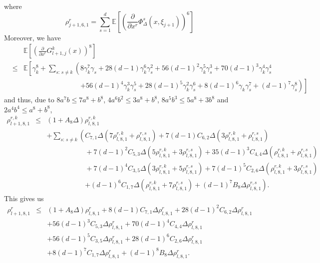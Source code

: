 \documentclass[11pt,a4paper]{amsart}
\theoremstyle{plain}
\theoremstyle{definition}
\theoremstyle{remark}
\numberwithin{equation}{section}
\newcommand*{\EE}{\mathbb E}
\renewcommand*{\doteq}{:=}
\begin{document}
where 
\[
\rho_{j+1,6,1}^{r}=\sum_{s=1}^d\EE\left[\left(\frac{\partial}{\partial x^r}\Phi_{\Delta}^s\left(x,\xi_{j+1}\right)\right)^{6}\right]
\]
Moreover, we have
\begin{eqnarray*}
&&\EE\left[\left(\frac{\partial}{\partial x^r}G_{l+1,j}^k(x)\right)^{8}\right]\\
&\leq&\EE\left[\gamma_k^8+\sum_{s:\,s\neq k}\left(8\gamma_k^7\gamma_s+28(d-1)\gamma_k^6\gamma_s^2+56(d-1)^2\gamma_k^5\gamma_s^3+70(d-1)^3\gamma_k^4\gamma_s^4\right.\right.\\
&&\phantom{\EE\left[\right.\gamma_k^8+\sum_{s:\,s\neq k}\left(\right.}\left.\left.+56(d-1)^4\gamma_k^3\gamma_s^5+28(d-1)^5\gamma_k^2\gamma_s^6+8(d-1)^6\gamma_k\gamma_s^7+(d-1)^7\gamma_s^8\right)\right]
\end{eqnarray*}
and thus, due to $8a^7b\le 7a^8+b^8$, $4a^6b^2\le 3a^8+b^8$, $8a^5b^3\le 5a^8+3b^8$ and $2a^4b^4\le a^8+b^8$,
\begin{eqnarray*}
\rho_{l+1,8,1}^{r,k}
&\le & (1+A_{8}\Delta)\rho_{l,8,1}^{r,k}\\
&&
+\sum_{s:\,s\neq k}\left(C_{7,1}\Delta(7\rho_{l,8,1}^{r,k}+\rho_{l,8,1}^{r,s})+7(d-1)C_{6,2}\Delta(3\rho_{l,8,1}^{r,k}+\rho_{l,8,1}^{r,s})\right.\\
&&\phantom{+\sum_{s:\,s\neq k}\left(\right.}+7(d-1)^2C_{5,3}\Delta(5\rho_{l,8,1}^{r,k}+3\rho_{l,8,1}^{r,s})+35(d-1)^3C_{4,4}\Delta(\rho_{l,8,1}^{r,k}+\rho_{l,8,1}^{r,s})\\
&&\phantom{+\sum_{s:\,s\neq k}\left(\right.}+7(d-1)^4C_{3,5}\Delta(3\rho_{l,8,1}^{r,k}+5\rho_{l,8,1}^{r,s})+7(d-1)^5C_{2,6}\Delta(\rho_{l,8,1}^{r,k}+3\rho_{l,8,1}^{r,s})\\
&&\phantom{+\sum_{s:\,s\neq k}\left(\right.}\left.+(d-1)^6C_{1,7}\Delta(\rho_{l,8,1}^{r,k}+7\rho_{l,8,1}^{r,s})+ (d-1)^7B_{8}\Delta\rho_{l,8,1}^{r,s}\right).
\end{eqnarray*}
This gives us
\begin{eqnarray*}
\rho_{l+1,8,1}^{r}
&\le & (1+A_{8}\Delta)\rho_{l,8,1}^{r}
+8(d-1)C_{7,1}\Delta\rho_{l,8,1}^{r}+28(d-1)^2C_{6,2}\Delta\rho_{l,8,1}^{r}\\
&&+56(d-1)^3C_{5,3}\Delta\rho_{l,8,1}^{r}+70(d-1)^4C_{4,4}\Delta\rho_{l,8,1}^{r}\\
&&+56(d-1)^5C_{3,5}\Delta\rho_{l,8,1}^{r}+28(d-1)^6C_{2,6}\Delta\rho_{l,8,1}^{r}\\
&&+8(d-1)^7C_{1,7}\Delta\rho_{l,8,1}^{r}+ (d-1)^8B_{8}\Delta\rho_{l,8,1}^{r}.
\end{eqnarray*}
\end{document}
